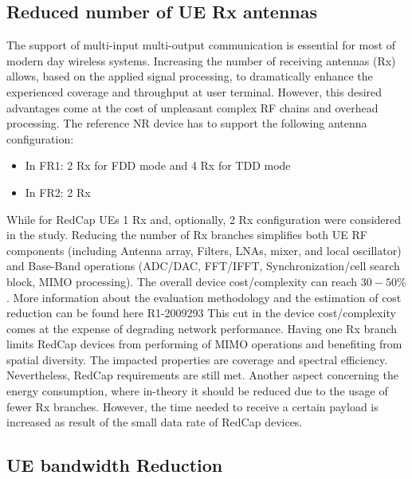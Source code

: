 \documentclass[conference]{IEEEtran}
\begin{document}
\subsection{Reduced number of UE Rx antennas}
\label{sec:4-1}

The support of multi-input multi-output communication is essential for most of  modern day wireless systems. Increasing the number of receiving antennas (Rx) allows, based on the applied signal processing, to dramatically enhance the experienced coverage and throughput at user terminal. However, this desired advantages come at the cost of unpleasant complex RF chains and overhead processing. The reference NR device has to support the following antenna configuration:
\begin{itemize}
    \item In FR1: 2 Rx for FDD mode and 4 Rx for TDD mode
    \item In FR2: 2 Rx
\end{itemize}
While for RedCap UEs 1 Rx and, optionally, 2 Rx configuration were considered in the study.
Reducing the number of Rx branches simplifies both UE RF components (including Antenna array, Filters, LNAs, mixer, and local oscillator) and Base-Band operations (ADC/DAC, FFT/IFFT, Synchronization/cell search block, MIMO processing). The overall device cost/complexity can reach $30-50\%$. More information about the evaluation methodology and the estimation of cost reduction can be found here R1-2009293 \cite{3gpp.R1-2009293}
This cut in the device cost/complexity comes at the expense of degrading network performance. Having one Rx branch limits RedCap devices from performing of MIMO operations and benefiting from spatial diversity. The impacted properties are coverage and spectral efficiency. Nevertheless, RedCap requirements are still met. Another aspect concerning the energy consumption, where in-theory it should be reduced due to the usage of fewer Rx branches. However, the time needed to receive a certain payload is increased as result of the small data rate of RedCap devices.

\subsection{UE bandwidth Reduction}
\label{sec:4-2}
\end{document}
